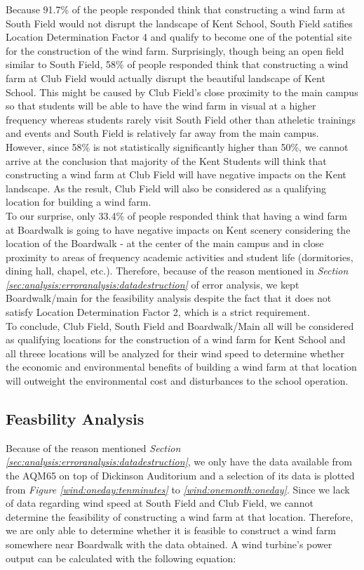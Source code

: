 \documentclass[review]{elsarticle}
\begin{document}
Because 91.7\% of the people responded think that constructing a wind farm at South Field would not disrupt the landscape of Kent School, South Field satifies Location Determination Factor 4 
and qualify to become one of the potential site for the construction of the wind farm. Surprisingly, though being an open field similar to South Field, 58\% of people responded think that constructing
a wind farm at Club Field would actually disrupt the beautiful landscape of Kent School. This might be caused by Club Field's close proximity to the main campus so that students will be able to 
have the wind farm in visual at a higher frequency whereas students rarely visit South Field other than atheletic trainings and events and South Field is relatively far away from the main campus. 
However, since 58\% is not statistically significantly higher than 50\%, we cannot arrive at the conclusion that majority of the Kent Students will think that constructing a wind farm at Club Field 
will have negative impacts on the Kent landscape. As the result, Club Field will also be considered as a qualifying location for building a wind farm.
\\\indent To our surprise, only 33.4\% of people responded think that having a wind farm at Boardwalk is going to have negative impacts on Kent scenery considering the location of the Boardwalk - at the center of 
the main campus and in close proximity to areas of frequency academic activities and student life (dormitories, dining hall, chapel, etc.). Therefore, because of the reason mentioned in \textit{Section \ref{sec:analysis:erroranalysis:datadestruction}} of 
error analysis, we kept Boardwalk/main for the feasibility analysis despite the fact that it does not satisfy Location Determination Factor 2, which is a strict requirement.
\\\indent To conclude, Club Field, South Field and Boardwalk/Main all will be considered as qualifying locations for the construction of a wind farm for Kent School and all threee locations will be analyzed 
for their wind speed to determine whether the economic and environmental benefits of building a wind farm at that location will outweight the environmental cost and disturbances to the school operation.


\subsection{Feasbility Analysis}

Because of the reason mentioned \textit{Section \ref{sec:analysis:erroranalysis:datadestruction}}, we only have the data available from the AQM65 on top of Dickinson Auditorium and a selection of its data is plotted 
from \textit{Figure \ref{wind:oneday:tenminutes}} to \textit{\ref{wind:onemonth:oneday}}. Since we lack of data regarding wind speed at South Field and Club Field, we cannot determine the feasibility of constructing a 
wind farm at that location. Therefore, we are only able to determine whether it is feasible to construct a wind farm somewhere near Boardwalk with the data obtained. A wind turbine's power output can 
be calculated with the following equation:
\end{document}
